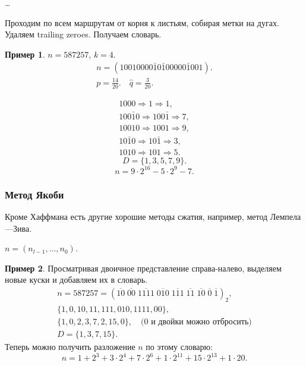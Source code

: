 \documentclass[12pt]{article}%
\theoremstyle{remark}
\theoremstyle{definition}
\newtheorem{Ex}{Пример}
\begin{document}
\ldots

Проходим по всем маршрутам от корня к листьям, собирая метки на дугах.
Удаляем trailing zeroes. Получаем словарь.

\begin{Ex}$n=587257$, $k = 4$.
\begin{gather*}
n = (10010000\bar{1}0\bar{1}00000\bar{1}001).\\
p = \frac{14}{20}. \quad \hat{q}=\frac 3 {20}.
\end{gather*}
\begin{center}
%
\end{center}
\end{Ex}
\begin{gather*}
1000 \Rightarrow 1 \Rightarrow 1,\\
100\bar{1}0 \Rightarrow 100\bar{1} \Rightarrow 7,\\
10010 \Rightarrow 1001 \Rightarrow 9,\\
10\bar{1}0 \Rightarrow 10\bar{1} \Rightarrow 3,\\
1010 \Rightarrow 101 \Rightarrow 5. 
\end{gather*}
$$D = \{1,3,5,7,9\}.$$
$$n = 9 \cdot 2^16 - 5 \cdot 2^9 - 7.$$

\subsubsection{Метод Якоби}
Кроме Хаффмана есть другие хорошие методы сжатия, например, метод Лемпела—Зива.

$n = (n_{l-1}, \ldots , n_0)$. 

\begin{Ex}
Просматривая двоичное представление справа-налево, выделяем новые куски и
добавляем их в словарь.
\begin{gather*}
n=587257 = (\overline{10}\; \overline{00}\;
\overline{1111}\; \overline{010}\; \overline{111}\; \overline{11}\; 
\overline{10}\; \overline {0}\; \overline{1})_2, \\
\{1, 0, 10, 11, 111, 010, 1111, 00\},\\
\{1, 0, 2, 3, 7, 2, 15, 0\}, \quad \text{($0$ и двойки можно отбросить)}\\
D = \{ 1, 3, 7, 15 \}.
\end{gather*}
Теперь можно получить разложение $n$ по этому словарю:
$$
    n = 1+ 2^3 + 3\cdot 2^4 + 7 \cdot 2^6 + 1\cdot2^11
    + 15 \cdot 2^13 + 1\cdot 20.
$$
\end{Ex}
\end{document}

